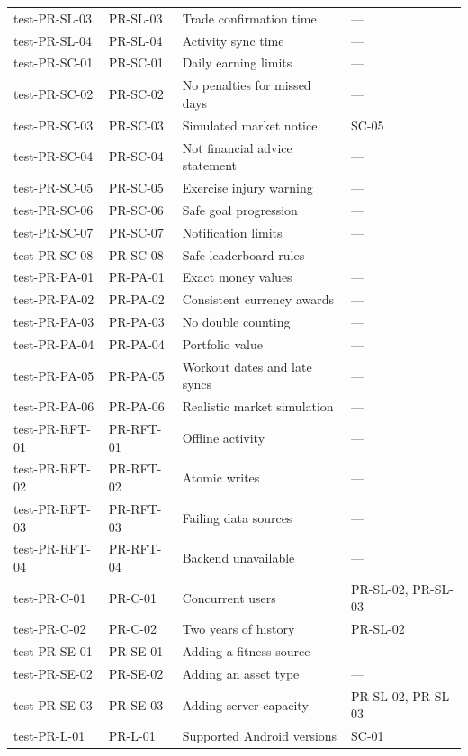\documentclass[12pt, titlepage]{article}
\begin{document}
\begin{xltabular}{\textwidth}{p{3cm}p{2.3cm}>{\raggedright\arraybackslash}X>{\raggedright\arraybackslash}p{2.4cm}}
  test-PR-SL-03 & PR-SL-03 & Trade confirmation time & ---\\
  test-PR-SL-04 & PR-SL-04 & Activity sync time & ---\\
  test-PR-SC-01 & PR-SC-01 & Daily earning limits & ---\\
  test-PR-SC-02 & PR-SC-02 & No penalties for missed days & ---\\
  test-PR-SC-03 & PR-SC-03 & Simulated market notice & SC-05\\
  test-PR-SC-04 & PR-SC-04 & Not financial advice statement & ---\\
  test-PR-SC-05 & PR-SC-05 & Exercise injury warning & ---\\
  test-PR-SC-06 & PR-SC-06 & Safe goal progression & ---\\
  test-PR-SC-07 & PR-SC-07 & Notification limits & ---\\
  test-PR-SC-08 & PR-SC-08 & Safe leaderboard rules & ---\\
  test-PR-PA-01 & PR-PA-01 & Exact money values & ---\\
  test-PR-PA-02 & PR-PA-02 & Consistent currency awards & ---\\
  test-PR-PA-03 & PR-PA-03 & No double counting & ---\\
  test-PR-PA-04 & PR-PA-04 & Portfolio value & ---\\
  test-PR-PA-05 & PR-PA-05 & Workout dates and late syncs & ---\\
  test-PR-PA-06 & PR-PA-06 & Realistic market simulation & ---\\
  test-PR-RFT-01 & PR-RFT-01 & Offline activity & ---\\
  test-PR-RFT-02 & PR-RFT-02 & Atomic writes & ---\\
  test-PR-RFT-03 & PR-RFT-03 & Failing data sources & ---\\
  test-PR-RFT-04 & PR-RFT-04 & Backend unavailable & ---\\
  test-PR-C-01 & PR-C-01 & Concurrent users & PR-SL-02, PR-SL-03\\
  test-PR-C-02 & PR-C-02 & Two years of history & PR-SL-02\\
  test-PR-SE-01 & PR-SE-01 & Adding a fitness source & ---\\
  test-PR-SE-02 & PR-SE-02 & Adding an asset type & ---\\
  test-PR-SE-03 & PR-SE-03 & Adding server capacity & PR-SL-02, PR-SL-03\\
  test-PR-L-01 & PR-L-01 & Supported Android versions & SC-01\\

\end{xltabular}
\end{document}
